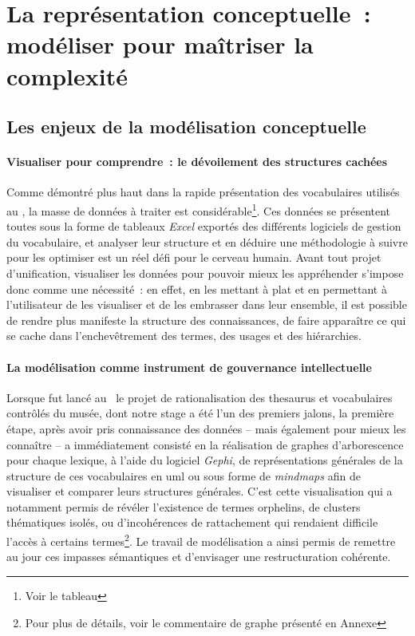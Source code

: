 \section[La modélisation]{\label{III-A-1}La représentation conceptuelle~: modéliser pour maîtriser la complexité}

\subsection{Les enjeux de la modélisation conceptuelle}

\paragraph*{Visualiser pour comprendre~: le dévoilement des structures cachées}
Comme démontré plus haut dans la rapide présentation des vocabulaires utilisés au \mae, la masse de données à traiter est considérable\footnote{Voir le tableau }. Ces données se présentent toutes sous la forme de tableaux \textit{Excel}  exportés des différents logiciels de gestion du vocabulaire, et analyser leur structure et en déduire une méthodologie à suivre pour les optimiser est un réel défi pour le cerveau humain. Avant tout projet d'unification, visualiser les données pour pouvoir mieux les appréhender s’impose donc comme une nécessité~: en effet, en les mettant à plat et en permettant à l'utilisateur de les visualiser et de les embrasser dans leur ensemble, il est possible de rendre plus manifeste la structure des connaissances, de faire apparaître ce qui se cache dans l’enchevêtrement des termes, des usages et des hiérarchies.

\paragraph*{La modélisation comme instrument de gouvernance intellectuelle}
Lorsque fut lancé au \mae~le projet de rationalisation des \gls{thesaurus} et vocabulaires contrôlés du musée, dont notre stage a été l'un des premiers jalons, la première étape, après avoir pris connaissance des données -- mais également pour mieux les connaître -- a immédiatement consisté en la réalisation de graphes d’arborescence pour chaque lexique, à l’aide du logiciel \textit{Gephi}, de représentations générales de la structure de ces vocabulaires en \acf{uml} ou sous forme de \textit{mindmaps} afin de visualiser et comparer leurs structures générales. C'est cette visualisation qui a notamment permis de révéler l’existence de termes orphelins, de clusters thématiques isolés, ou d’incohérences de rattachement qui rendaient difficile l'accès à certains termes\footnote{Pour plus de détails, voir le commentaire de graphe présenté en Annexe }. Le travail de modélisation a ainsi permis de remettre au jour ces impasses sémantiques et d’envisager une restructuration cohérente.

